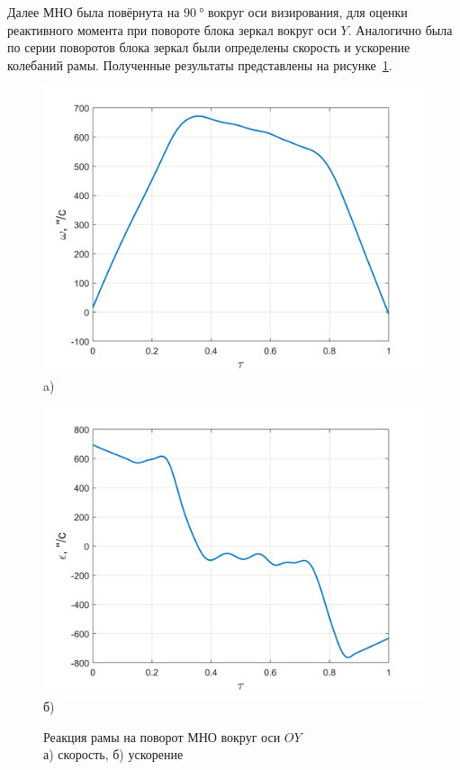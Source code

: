 Далее МНО была повёрнута на $\SI{90}{\degree}$ вокруг оси визирования, для оценки реактивного момента при повороте блока зеркал вокруг оси $Y$. Аналогично была по серии поворотов блока зеркал были определены скорость и ускорение колебаний рамы. Полученные результаты представлены на рисунке~\cref{fig:oy-gyro}.

\begin{figure}[!h]
	\begin{minipage}[b][][b]{0.49\linewidth}\centering
		\includegraphics[width=0.9\linewidth]{matlab/img/oy-gyro.png} \\ a)
	\end{minipage}
	\hfill
	\begin{minipage}[b][][b]{0.49\linewidth}\centering
		\includegraphics[width=0.9\linewidth]{matlab/img/oy-gyro-acc.png} \\ б)
	\end{minipage}
	\caption{Реакция рамы на поворот МНО вокруг оси $OY$ \\а) скорость, б) ускорение }
	\label{fig:oy-gyro}
\end{figure}



